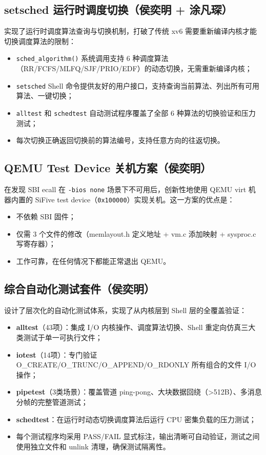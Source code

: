 \documentclass[12pt,a4paper]{ctexart}
\begin{document}
\subsection{setsched 运行时调度切换（侯奕明 + 涂凡琛）}

实现了运行时调度算法查询与切换机制，打破了传统 xv6 需要重新编译内核才能切换调度算法的限制：

\begin{itemize}
  \item \texttt{sched\_algorithm()} 系统调用支持 6 种调度算法（RR/FCFS/MLFQ/SJF/PRIO/EDF）的动态切换，无需重新编译内核；
  \item \texttt{setsched} Shell 命令提供友好的用户接口，支持查询当前算法、列出所有可用算法、一键切换；
  \item \texttt{alltest} 和 \texttt{schedtest} 自动测试程序覆盖了全部 6 种算法的切换验证和压力测试；
  \item 每次切换正确返回切换前的算法编号，支持任意方向的往返切换。
\end{itemize}

\subsection{QEMU Test Device 关机方案（侯奕明）}

在发现 SBI ecall 在 \texttt{-bios none} 场景下不可用后，创新性地使用 QEMU virt 机器内置的 SiFive test device（\texttt{0x100000}）实现关机。这一方案的优点是：
\begin{itemize}
  \item 不依赖 SBI 固件；
  \item 仅需 3 个文件的修改（memlayout.h 定义地址 + vm.c 添加映射 + sysproc.c 写寄存器）；
  \item 工作可靠，在任何情况下都能正常退出 QEMU。
\end{itemize}

\subsection{综合自动化测试套件（侯奕明）}

设计了层次化的自动化测试体系，实现了从内核层到 Shell 层的全覆盖验证：
\begin{itemize}
  \item \textbf{alltest}（43项）：集成 I/O 内核操作、调度算法切换、Shell 重定向仿真三大类测试于单一可执行文件；
  \item \textbf{iotest}（14项）：专门验证 O\_CREATE/O\_TRUNC/O\_APPEND/O\_RDONLY 所有组合的文件 I/O 操作；
  \item \textbf{pipetest}（3类场景）：覆盖管道 ping-pong、大块数据回绕（>512B）、多消息分帧的完整管道测试；
  \item \textbf{schedtest}：在运行时动态切换调度算法后运行 CPU 密集负载的压力测试；
  \item 每个测试程序均采用 PASS/FAIL 显式标注，输出清晰可自动验证，测试之间使用独立文件和 unlink 清理，确保测试隔离性。
\end{itemize}
\end{document}
